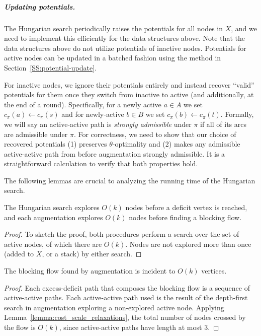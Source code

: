 \documentclass[a4paper,UKenglish]{socg-lipics-v2018}
\theoremstyle{plain}
\numberwithin{figure}{section}
\renewcommand{\paragraph}{\subparagraph}
\def\EMPH#1{\textcolor{BrickRed}{{\emph{#1}}}}
\begin{document}
\paragraph{Updating potentials.}
The Hungarian search periodically raises the potentials for all nodes in $X$,
and we need to implement this efficiently for the data structures above.
Note that the data structures above do not utilize potentials of inactive nodes.
Potentials for active nodes can be updated in a batched fashion using the
method in Section~\ref{SS:potential-update}.

For inactive nodes, we ignore their potentials entirely and instead recover
``valid'' potentials for them once they switch from inactive to active
(and additionally, at the end of a round).
Specifically, for a newly active $a \in A$ we set $c_\pi(a) \gets c_\pi(s)$
and for newly-active $b \in B$ we set $c_\pi(b) \gets c_\pi(t)$.
Formally, we will say an active-active path is \EMPH{strongly admissible}
under $\pi$ if all of its arcs are admissible under $\pi$.
For correctness, we need to show that our choice of recovered potentials
(1) preserves $\theta$-optimality and (2) makes any admissible active-active
path from before augmentation strongly admissible.
It is a straightforward calculation to verify that both properties hold.

The following lemmas are crucial to analyzing the running time of the Hungarian search.

\begin{lemma}
\label{lemma:cost_scale_relaxations}
The Hungarian search explores $O(k)$ nodes before a deficit vertex is reached,
and each augmentation explores $O(k)$ nodes before finding a blocking flow.
\end{lemma}
\begin{proof}
To sketch the proof, both procedures perform a search over the set of active
nodes, of which there are $O(k)$.
Nodes are not explored more than once (added to $X$, or a stack) by either search.
\end{proof}

\begin{lemma}
\label{lemma:blocking_incidences}
The blocking flow found by augmentation is incident to $O(k)$ vertices.
\end{lemma}
\begin{proof}
Each excess-deficit path that composes the blocking flow is a sequence of
active-active paths.
Each active-active path used is the result of the depth-first search in
augmentation exploring a non-explored active node.
Applying Lemma~\ref{lemma:cost_scale_relaxations}, the total number of nodes
crossed by the flow is $O(k)$, since active-active paths have length at most 3.
\end{proof}
\end{document}
